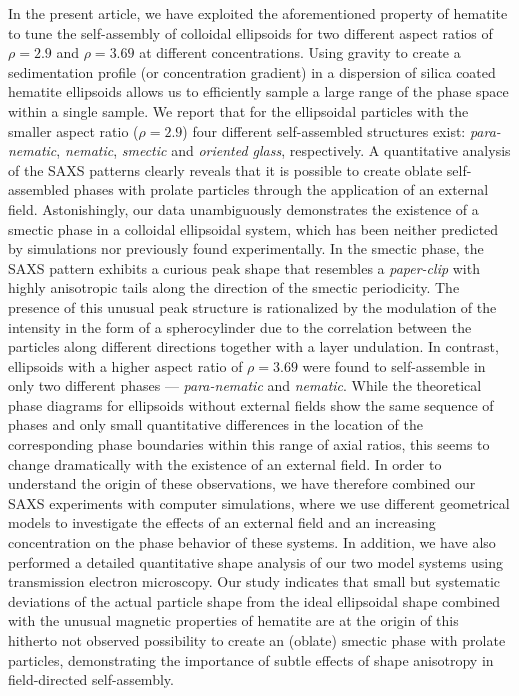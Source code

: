 \documentclass[aps,prl,preprint,superscriptaddress,showkeys]{revtex4-2} %
\begin{document}
In the present article, we have exploited the aforementioned property of hematite to tune the self-assembly of colloidal ellipsoids for two different aspect ratios of $\rho = 2.9$ and $\rho = 3.69$ at different concentrations. Using gravity to create a sedimentation profile (or concentration gradient) in a dispersion of silica coated hematite ellipsoids allows us to efficiently sample a large range of the phase space within a single sample. We report that for the ellipsoidal particles with the smaller aspect ratio ($\rho=2.9$) four different self-assembled structures exist: \emph{para-nematic}, \emph{nematic}, \emph{smectic} and \emph{oriented glass}, respectively. A quantitative analysis of the SAXS patterns clearly reveals that it is possible to create oblate self-assembled phases with prolate particles through the application of an external field. Astonishingly, our data unambiguously demonstrates the existence of a smectic phase in a colloidal ellipsoidal system, which has been neither predicted by simulations nor previously found experimentally. In the smectic phase, the SAXS pattern exhibits a curious peak shape that resembles a \textit{paper-clip} with highly anisotropic tails along the direction of the smectic periodicity. The presence of this unusual peak structure is rationalized by the modulation of the intensity in the form of a spherocylinder due to the correlation between the particles along different directions together with a layer undulation. In contrast, ellipsoids with a higher aspect ratio of $\rho=3.69$ were found to self-assemble in only two different phases --- \emph{para-nematic} and \emph{nematic}. While the theoretical phase diagrams for ellipsoids without external fields show the same sequence of phases and only small quantitative differences in the location of the corresponding phase boundaries within this range of axial ratios, this seems to change dramatically with the existence of an external field. In order to understand the origin of these observations, we have therefore combined our SAXS experiments with computer simulations, where we use different geometrical models to investigate the effects of an external field and an increasing concentration on the phase behavior of these systems. In addition, we have also performed a detailed quantitative shape analysis of our two model systems using transmission electron microscopy. Our study indicates that small but systematic deviations of the actual particle shape from the ideal ellipsoidal shape combined with the unusual magnetic properties of hematite are at the origin of this hitherto not observed possibility to create an (oblate) smectic phase with prolate particles, demonstrating the importance of subtle effects of shape anisotropy in field-directed self-assembly.
\end{document}
